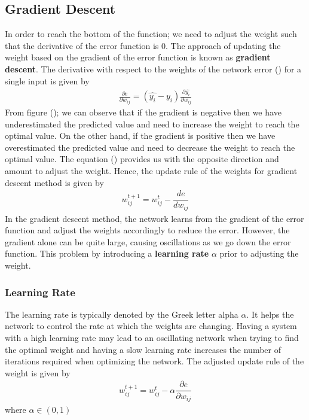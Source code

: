 \subsection{Gradient Descent}
In order to reach the bottom of the function; we need to adjust the weight such that the derivative of the error function is 0. The approach of updating the weight based on the gradient of the error function is known as \textbf{gradient descent}. The derivative with respect to the weights of the network error () for a single input is given by
\begin{align}
  \frac{\partial e}{\partial w_{ij}} = (\widehat{y_i}-y_i)\frac{\partial \widehat{y_i}}{\partial w_{ij}}
  \label{derivative_network_error}
\end{align}
From figure (); we can observe that if the gradient is negative then we have underestimated the predicted value and need to increase the weight to reach the optimal value. On the other hand, if the gradient is positive then we have overestimated the predicted value and need to decrease the weight to reach the optimal value. The equation () provides us with the opposite direction and amount to adjust the weight. Hence, the update rule of the weights for gradient descent method is given by
\begin{align}
  w_{ij}^{t+1} = w_{ij}^{t} - \dfrac{de}{dw_{ij}}
\end{align}
In the gradient descent method, the network learns from the gradient of the error function and adjust the weights accordingly to reduce the error. However, the gradient alone can be quite large, causing oscillations as we go down the error function. This problem by introducing a \textbf{learning rate} $\alpha$ prior to adjusting the weight.
\subsubsection*{Learning Rate}
The learning rate is typically denoted by the Greek letter alpha $\alpha$. It helps the network to control the rate at which the weights are changing. Having a system with a high learning rate may lead to an oscillating network when trying to find the optimal weight and having a slow learning rate increases the number of iterations required when optimizing the network. The adjusted update rule of the weight is given by
\begin{align}
  w_{ij}^{t+1} = w_{ij}^{t} - \alpha\dfrac{\partial e}{\partial w_{ij}}
\end{align}
where $\alpha \in (0,1)$
